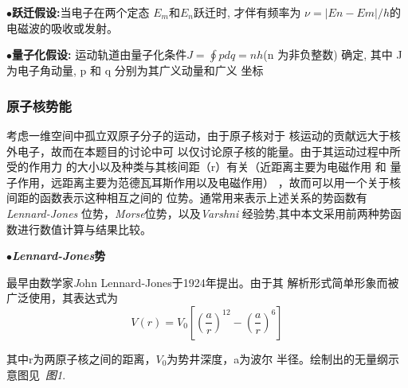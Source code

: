 \documentclass[11pt, a4paper, oneside]{ctexart}
\begin{document}
{{$\bullet${\bfseries{跃迁假设:}}{当电子在两个定态
$E_m$和$E_n$跃迁时, 才伴有频率为 $\nu=|E n −
E m |/h$的电磁波的吸收或发射。}


$\bullet${\bfseries{量子化假设:}}{
运动轨道由量子化条件$J =\oint pdq = 
nh $(n 为非负整数) 确定, 其中
J 为电子角动量, p 和 q 分别为其广义动量和广义
坐标}
}

\subsubsection{原子核势能}{
    考虑一维空间中孤立双原子分子的运动，由于原子核对于
    核运动的贡献远大于核外电子，故而在本题目的讨论中可
    以仅讨论原子核的能量。由于其运动过程中所受的作用力
    的大小以及种类与其核间距（r）有关（近距离主要为电磁作用
    和
    量子作用，远距离主要为范德瓦耳斯作用以及电磁作用）
    ，故而可以用一个关于核间距的函数表示这种相互之间的
    位势。通常用来表示上述关系的势函数有\emph{Lennard-Jones}
    位势，\emph{Morse}位势，以及\emph {Varshni}
    经验势,其中本文采用前两种势函数进行数值计算与结果比较。


$\bullet${}\bfseries{\emph{Lennard-Jones}势}}


{
    最早由数学家{\emph John Lennard-Jones}于1924年提出。由于其
    解析形式简单形象而被广泛使用，其表达式为
\begin{equation}
    V(r)=V_0[(\frac{a}{r})^{12}-(\frac{a}{r})^6]
\end{equation}


{其中r为两原子核之间的距离，$V_0$为势井深度，a为波尔
    半径。绘制出的无量纲示意图见\ \emph{图1}.}
}

{
    \begin{center}
          

\end{center}}}
\end{document}

